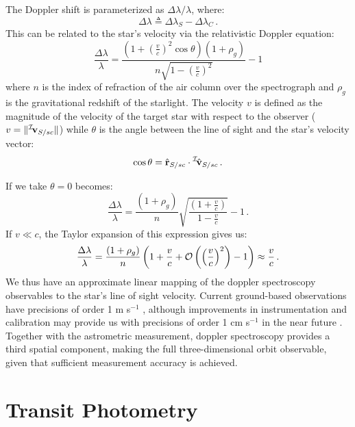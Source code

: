 The Doppler shift is parameterized as $\Delta\lambda/\lambda$, where:
\begin{equation}
\Delta\lambda \triangleq \Delta\lambda_S - \Delta\lambda_C \,.
\end{equation}
This can be related to the star's velocity via the relativistic Doppler equation:
\begin{equation}\label{eq:doppler}
\frac{\Delta\lambda}{\lambda} = \frac{\left(1 + \left(\frac{v}{c}\right)^2\cos\theta\right)\left(1 + \rho_g\right)}{n\sqrt{1 - \left(\frac{v}{c}\right)^2}} - 1
\end{equation}
where $n$ is the index of refraction of the air column over the spectrograph and  $\rho_g$ is the gravitational redshift of the starlight.  The velocity $v$ is defined as the magnitude of the velocity of the target star with respect to the observer ($v = \Vert \leftexp{\mc I}{\mf v_{S/sc}}\Vert$) while $\theta$ is the angle between the line of sight and the star's velocity vector:
\begin{equation}
\cos\theta = \hat{\mf r}_{S/sc}\cdot \leftexp{\mc I}{\hat{\mf v}_{S/sc}} \,.
\end{equation}

If we take $\theta = 0$  becomes:
\begin{equation}
\frac{\Delta\lambda}{\lambda} = \frac{\left(1 + \rho_g\right)}{n} \sqrt{\frac{\left(1 + \frac{v}{c}\right)}{1 -\frac{v}{c}}} - 1 \,.
\end{equation}
If $v \ll c$, the Taylor expansion of this expression gives us:
\begin{equation}
\frac{\Delta\lambda}{\lambda} = \frac{\left(1 + \rho_g\right)}{n}\left(1 + \frac{v}{c} + \mathcal O\left( \left(\frac{v}{c}\right)^2\right) - 1\right) \approx \frac{v}{c} \,.
\end{equation}
We thus have an approximate linear mapping of the doppler spectroscopy observables to the star's line of sight velocity.  Current ground-based observations have precisions of order 1 m s$^{-1}$ \citep{butler2006}, although improvements in instrumentation and calibration may provide us with precisions of order 1 cm s$^{-1}$ in the near future \citep{lovis2006exoplanet}.  Together with the astrometric measurement, doppler spectroscopy provides a third spatial component, making the full three-dimensional orbit observable, given that sufficient measurement accuracy is achieved.


\section{Transit Photometry}\label{sec:photometry}

